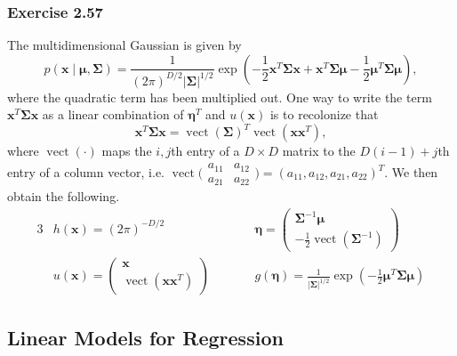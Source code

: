 \documentclass[12pt, a4paper]{article}
\newcommand{\vect}[1]{\bm{#1}}
\newcommand{\abs}[1]{\left\lvert#1\right\rvert}
\begin{document}
\subsubsection*{Exercise 2.57}
The multidimensional Gaussian is given by 
\begin{equation*}
	p\left(\vect{x} \mid \vect{\mu}, \vect{\Sigma} \right)
	= \frac{1}{(2 \pi )^{D /2} \abs{\vect{\Sigma}}^{1/2}}
	\exp \left( 
	-\frac{1}{2} \vect{x}^T \vect{\Sigma} \vect{x} 
	+ \vect{x}^T \vect{\Sigma} \vect{\mu}
	- \frac{1}{2} \vect{\mu}^T \vect{\Sigma} \vect{\mu}
	\right),
\end{equation*}
where the quadratic term has been multiplied out. 
One way to write the term $\vect{x}^T \vect{\Sigma} \vect{x}$ as a linear combination of $\vect{\eta}^T$ and $u(\vect{x})$ is to recolonize that
\begin{equation*}
	\vect{x}^T \vect{\Sigma} \vect{x} = 
	\operatorname{vect}\left( \vect{\Sigma} \right)^T 
	\operatorname{vect}\left( \vect{x} \vect{x}^T \right),
\end{equation*}
where $\operatorname{vect}\left( \cdot \right)$ maps the $i,j$th entry of a $D \times D$ matrix to the $D(i-1) + j$th entry of a column vector, i.e. $\operatorname{vect} \bigl(\begin{smallmatrix}
a_{11} & a_{12} \\ 
a_{21} & a_{22}
\end{smallmatrix}\bigr)
= (a_{11}, a_{12}, a_{21}, a_{22})^T$.
We then obtain the following.
\begin{alignat*}{3}
	&h(\vect{x}) = (2 \pi)^{-D/2} 
	\qquad
	&&\vect{\eta} = 
		\begin{pmatrix}
		\vect{\Sigma}^{-1} \vect{\mu}
		\\ 
		- \frac{1}{2} \operatorname{vect}\left( \vect{\Sigma}^{-1} \right)
		\end{pmatrix} 
	\\
	&u(\vect{x}) = 
		\begin{pmatrix}
		\vect{x} \\ \operatorname{vect}\left(\vect{x} \vect{x}^T \right)
		\end{pmatrix} 
	\qquad
	&&g(\vect{\eta}) = 
	 \frac{1}{\abs{\vect{\Sigma}}^{1/2}}
	 \exp \left( 
	 - \frac{1}{2} \vect{\mu}^T \vect{\Sigma} \vect{\mu}
	 \right)
\end{alignat*}



\subsection{Linear Models for Regression}
\end{document}
